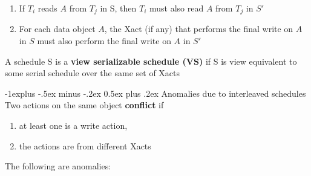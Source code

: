 \documentclass[9pt, landscape]{extarticle}
\makeatletter
\renewcommand{\subsection}{\@startsection{subsection}{2}{0mm}%
  {-1explus -.5ex minus -.2ex}%
  {0.5ex plus .2ex}%
{\normalfont\normalsize\bfseries}}
\makeatother
\begin{document}
\begin{multicols*}{4}
  \begin{enumerate}
    \item If $T_i$ reads $A$ from $T_j$ in S, then $T_i$ must also read $A$ from $T_j$ in $S'$
    \item For each data object $A$, the Xact (if any) that performs the final write on $A$ in $S$ must also perform the final write on $A$ in $S'$
  \end{enumerate}

  A schedule S is a \textbf{view serializable schedule (VS)} if S is view equivalent to some serial schedule over the same set of Xacts

  \subsection{Anomalies due to interleaved schedules}
  Two actions on the same object \textbf{conflict} if
  
  \begin{enumerate}
    \item at least one is a write action,
    \item the actions are from different Xacts 
  \end{enumerate}

  The following are anomalies:
  

\end{multicols*}
\end{document}
